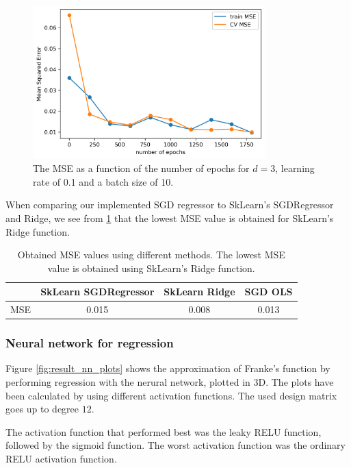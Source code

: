 \documentclass[../main.tex]{subfiles}
\begin{document}
\begin{figure}[!htb]
    \centering
    \includegraphics[width=0.8\textwidth]{../assets/epochs_vs_mse.png}
    \caption{The MSE as a function of the number of epochs for $d=3$, learning rate of 0.1 and a batch size of 10.}
    \label{fig:epochs_vs_mse}
\end{figure}

When comparing our implemented SGD regressor to SkLearn's SGDRegressor and Ridge, we see from \cref{tab:MSE} that the lowest MSE value is obtained for SkLearn's Ridge function.

\begin{table}[!htb]
\centering
\caption{Obtained MSE values using different methods. The lowest MSE value is obtained using SkLearn's Ridge function.}
\begin{tabular}{ cccc } 
 \toprule
  & SkLearn SGDRegressor & SkLearn Ridge & SGD OLS \\ 
 \midrule
 MSE  & 0.015 & 0.008 & 0.013 \\
 \bottomrule
\end{tabular}
\label{tab:MSE}
\end{table}

\subsubsection{Neural network for regression}
Figure \ref{fig:result_nn_plots} shows the approximation of Franke's function by performing regression with the nerural network, plotted in 3D. The plots have been calculated by using different activation functions. The used design matrix goes up to degree $12$.

The activation function that performed best was the leaky RELU function, followed by the sigmoid function. The worst activation function was the ordinary RELU activation function.
\end{document}
